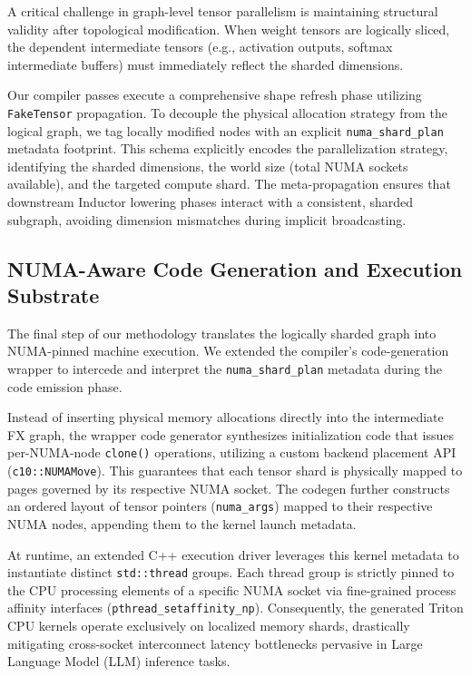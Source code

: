 A critical challenge in graph-level tensor parallelism is maintaining structural validity after topological modification. When weight tensors are logically sliced, the dependent intermediate tensors (e.g., activation outputs, softmax intermediate buffers) must immediately reflect the sharded dimensions. 

Our compiler passes execute a comprehensive shape refresh phase utilizing \texttt{FakeTensor} propagation. To decouple the physical allocation strategy from the logical graph, we tag locally modified nodes with an explicit \texttt{numa\_shard\_plan} metadata footprint. This schema explicitly encodes the parallelization strategy, identifying the sharded dimensions, the world size (total NUMA sockets available), and the targeted compute shard. The meta-propagation ensures that downstream Inductor lowering phases interact with a consistent, sharded subgraph, avoiding dimension mismatches during implicit broadcasting.

\subsection{NUMA-Aware Code Generation and Execution Substrate}

The final step of our methodology translates the logically sharded graph into NUMA-pinned machine execution. We extended the compiler's code-generation wrapper to intercede and interpret the \texttt{numa\_shard\_plan} metadata during the code emission phase.

Instead of inserting physical memory allocations directly into the intermediate FX graph, the wrapper code generator synthesizes initialization code that issues per-NUMA-node \texttt{clone()} operations, utilizing a custom backend placement API (\texttt{c10::NUMAMove}). This guarantees that each tensor shard is physically mapped to pages governed by its respective NUMA socket. The codegen further constructs an ordered layout of tensor pointers (\texttt{numa\_args}) mapped to their respective NUMA nodes, appending them to the kernel launch metadata.

At runtime, an extended C++ execution driver leverages this kernel metadata to instantiate distinct \texttt{std::thread} groups. Each thread group is strictly pinned to the CPU processing elements of a specific NUMA socket via fine-grained process affinity interfaces (\texttt{pthread\_setaffinity\_np}). Consequently, the generated Triton CPU kernels operate exclusively on localized memory shards, drastically mitigating cross-socket interconnect latency bottlenecks pervasive in Large Language Model (LLM) inference tasks.
